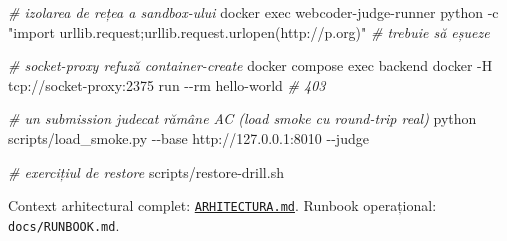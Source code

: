 \documentclass[
]{article}
\newenvironment{Shaded}{}{}
\newcommand{\AttributeTok}[1]{\textcolor[rgb]{0.49,0.56,0.16}{#1}}
\newcommand{\CommentTok}[1]{\textcolor[rgb]{0.38,0.63,0.69}{\textit{#1}}}
\newcommand{\ExtensionTok}[1]{#1}
\newcommand{\NormalTok}[1]{#1}
\newcommand{\StringTok}[1]{\textcolor[rgb]{0.25,0.44,0.63}{#1}}
\begin{document}
\begin{Shaded}
\begin{Highlighting}[]
\CommentTok{\# izolarea de rețea a sandbox{-}ului}
\ExtensionTok{docker}\NormalTok{ exec webcoder{-}judge{-}runner python }\AttributeTok{{-}c} \StringTok{"import urllib.request;urllib.request.urlopen(\textquotesingle{}http://p.org\textquotesingle{})"}   \CommentTok{\# trebuie să eșueze}

\CommentTok{\# socket{-}proxy refuză container{-}create}
\ExtensionTok{docker}\NormalTok{ compose exec backend docker }\AttributeTok{{-}H}\NormalTok{ tcp://socket{-}proxy:2375 run }\AttributeTok{{-}{-}rm}\NormalTok{ hello{-}world   }\CommentTok{\# 403}

\CommentTok{\# un submission judecat rămâne AC (load smoke cu round{-}trip real)}
\ExtensionTok{python}\NormalTok{ scripts/load\_smoke.py }\AttributeTok{{-}{-}base}\NormalTok{ http://127.0.0.1:8010 }\AttributeTok{{-}{-}judge}

\CommentTok{\# exercițiul de restore}
\ExtensionTok{scripts/restore{-}drill.sh}
\end{Highlighting}
\end{Shaded}

Context arhitectural complet:
\href{ARHITECTURA.md}{\texttt{ARHITECTURA.md}}. Runbook operațional:
\texttt{docs/RUNBOOK.md}.
\end{document}
